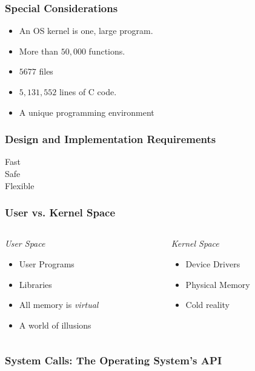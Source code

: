 \documentclass[pdftex]{beamer} %
\begin{document}
\begin{frame}
  \frametitle{Special Considerations}
  \begin{itemize}
  \item An OS kernel is one, large program.
  \item More than $50,000$ functions.
  \item $5677$ files    
  \item $5,131,552$ lines of C code.
  \item A unique programming environment
  \end{itemize}
\end{frame}

\begin{frame}
  \frametitle{Design and Implementation Requirements}
  \begin{description}
  \item[Fast]
  \item[Safe] 
  \item[Flexible] 
  \end{description}
\end{frame}

\begin{frame}[fragile]
  \frametitle{User vs. Kernel Space}
  \begin{columns}[t]
    \begin{column}{5cm}
      \emph{User Space}
      \begin{itemize}
      \item User Programs
      \item Libraries
      \item All memory is \emph{virtual}
      \item A world of illusions
      \end{itemize}
    \end{column}
    \begin{column}{5cm}
      \emph{Kernel Space}
      \begin{itemize}
      \item Device Drivers
      \item Physical Memory
      \item Cold reality
      \end{itemize}
    \end{column}
  \end{columns}
\end{frame}

\begin{frame}
  \frametitle{System Calls: The Operating System's API}
  
\end{frame}
\end{document}
